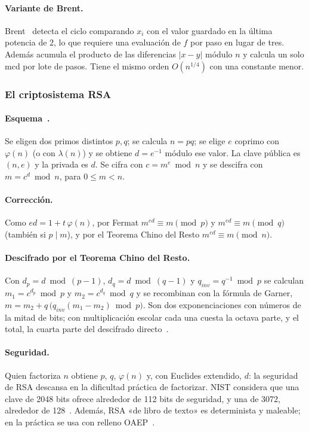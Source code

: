 \paragraph{Variante de Brent.} Brent~\cite{brent1980} detecta el ciclo
comparando $x_i$ con el valor guardado en la última potencia de 2, lo que
requiere una evaluación de $f$ por paso en lugar de tres. Además acumula el
producto de las diferencias $|x - y|$ módulo $n$ y calcula un solo mcd por lote
de pasos. Tiene el mismo orden $O(n^{1/4})$ con una constante menor.

\subsubsection{El criptosistema RSA}

\paragraph{Esquema~\cite{rsa1978}.} Se eligen dos primos distintos $p, q$; se
calcula $n = pq$; se elige $e$ coprimo con $\varphi(n)$ (o con $\lambda(n)$) y
se obtiene $d = e^{-1}$ módulo ese valor. La clave pública es $(n, e)$ y la
privada es $d$. Se cifra con $c = m^e \bmod n$ y se descifra con
$m = c^d \bmod n$, para $0 \le m < n$.

\paragraph{Corrección.} Como $ed = 1 + t\,\varphi(n)$, por Fermat
$m^{ed} \equiv m \pmod p$ y $m^{ed} \equiv m \pmod q$ (también si $p \mid m$),
y por el Teorema Chino del Resto $m^{ed} \equiv m \pmod n$.

\paragraph{Descifrado por el Teorema Chino del Resto.} Con
$d_p = d \bmod (p-1)$, $d_q = d \bmod (q-1)$ y $q_{inv} = q^{-1} \bmod p$ se
calculan $m_1 = c^{d_p} \bmod p$ y $m_2 = c^{d_q} \bmod q$ y se recombinan con
la fórmula de Garner, $m = m_2 + q\,\big(q_{inv}(m_1 - m_2) \bmod p\big)$.
Son dos exponenciaciones con números de la mitad de bits; con multiplicación
escolar cada una cuesta la octava parte, y el total, la cuarta parte del
descifrado directo~\cite{qc1982,hac}.

\paragraph{Seguridad.} Quien factoriza $n$ obtiene $p$, $q$, $\varphi(n)$ y,
con Euclides extendido, $d$: la seguridad de RSA descansa en la dificultad
práctica de factorizar. NIST considera que una clave de 2048 bits ofrece
alrededor de 112 bits de seguridad, y una de 3072, alrededor de
128~\cite{nist80057}. Además, RSA «de libro de texto» es determinista y
maleable; en la práctica se usa con relleno OAEP~\cite{rfc8017}.

